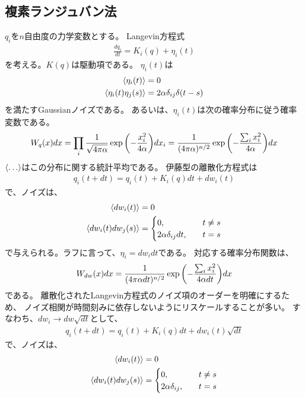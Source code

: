 \documentclass[]{ltjsarticle}
\begin{document}
\subsection{複素ランジュバン法}
$q_i$を$n$自由度の力学変数とする。
Langevin方程式
\begin{align}
    \frac{d q_i}{dt} = K_i(q) + \eta_i(t)
\end{align}
を考える。$K(q)$は駆動項である。
$\eta_i(t)$は
\begin{align}
    \expval{\eta_i(t)} &= 0 \\
    \expval{\eta_i(t) \eta_j(s)} &= 2\alpha \delta_{ij}\delta(t-s)
\end{align}
を満たすGaussianノイズである。
あるいは、$\eta_i(t)$は次の確率分布に従う確率変数である。
\begin{align}
    W_q(x)dx
    =
    \prod_i \frac{1}{\sqrt{4\pi\alpha}} 
    \exp\qty(-\frac{x_i^2}{4\alpha}) dx_i
    =
    \frac{1}{(4\pi\alpha)^{n/2}} 
    \exp\qty(-\frac{\sum_i x_i^2}{4\alpha}) dx
\end{align}
$\expval{\dots}$はこの分布に関する統計平均である。
伊藤型の離散化方程式は
\begin{align}
    q_i(t+dt) = q_i(t) + K_i(q) dt + dw_i(t)
\end{align}
で、ノイズは、
\begin{align}
    \expval{dw_i(t)} &= 0 \\
    \expval{dw_i(t) dw_j(s)} &= 
    \begin{cases}
        0, \quad& t \neq s \\
        2\alpha \delta_{ij} dt, \quad& t = s
    \end{cases} 
\end{align}
で与えられる。ラフに言って、$\eta_i = dw_i dt$である。
対応する確率分布関数は、
\begin{align}
    W_{dw}(x)dx
    =
    \frac{1}{(4\pi\alpha dt)^{n/2}} 
    \exp\qty(-\frac{\sum_i x_i^2}{4\alpha dt}) dx
\end{align}
である。
離散化されたLangevin方程式のノイズ項のオーダーを明確にするため、
ノイズ相関が時間刻みに依存しないようにリスケールすることが多い。
すなわち、$dw_i \to dw \sqrt{dt}$として、
\begin{align}
    q_i(t+dt) = q_i(t) + K_i(q) dt + dw_i(t) \sqrt{dt}
\end{align}
で、ノイズは、
\begin{align}
    \expval{dw_i(t)} &= 0 \\
    \expval{dw_i(t) dw_j(s)} &= 
    \begin{cases}
        0, \quad& t \neq s \\
        2\alpha \delta_{ij}, \quad& t = s
    \end{cases} 
\end{align}
\end{document}
